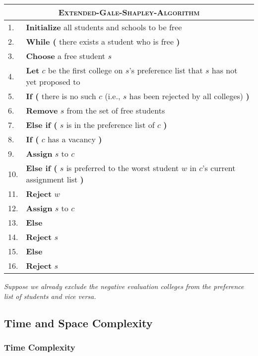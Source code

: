 \documentclass[a4paper,12pt]{article}
\begin{document}
\begin{center}
	\begin{tabular}{ll}
		\toprule
		\multicolumn{2}{c}{\textsc{Extended-Gale-Shapley-Algorithm}} \\
		\midrule
		1. & \textbf{Initialize} all students and schools to be free \\
		2. & \textbf{While (} there exists a student who is free \textbf{)} \\
		3. & \qquad \textbf{Choose} a free student $s$ \\
		4. & \qquad \textbf{Let} $c$ be the first college on $s$'s preference list that $s$ has not yet proposed to \\
		5. & \qquad \textbf{If (} there is no such $c$ (i.e., $s$ has been rejected by all colleges) \textbf{)} \\
		6. & \qquad \qquad \textbf{Remove} $s$ from the set of free students \\
		7. & \qquad \textbf{Else if (} $s$ is in the preference list of $c$ \textbf{)} \\
		8. & \qquad \qquad \textbf{If (} $c$ has a vacancy \textbf{)} \\
		9. & \qquad \qquad \qquad \textbf{Assign} $s$ to $c$ \\
		10. & \qquad \qquad \textbf{Else if (} $s$ is preferred to the worst student $w$ in $c$'s current assignment list \textbf{)} \\
		11. & \qquad \qquad \qquad \textbf{Reject} $w$ \\
		12. & \qquad \qquad \qquad \textbf{Assign} $s$ to $c$ \\
		13. & \qquad \qquad \textbf{Else} \\
		14. & \qquad \qquad \qquad \textbf{Reject} $s$ \\
		15. & \qquad \textbf{Else} \\
		16. & \qquad \qquad \textbf{Reject} $s$ \\
		\bottomrule
	\end{tabular}
\end{center}

\textit{Suppose we already exclude the negative evaluation colleges from the preference list of students and vice versa.}

\subsection*{Time and Space Complexity}

\subsubsection*{Time Complexity}
\end{document}
